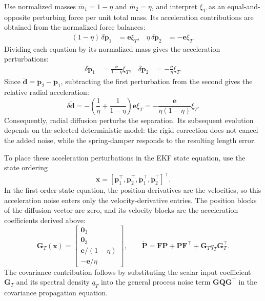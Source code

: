 \documentclass[]{article}
\newcommand{\x}{\bm{x}}
\newcommand{\Pm}{\mathbf{P}}
\newcommand{\Fm}{\mathbf{F}}
\newcommand{\Gm}{\mathbf{G}}
\newcommand{\Qm}{\mathbf{Q}}
\begin{document}
Use normalized masses $\bar m_1=1-\eta$ and $\bar m_2=\eta$, and interpret
$\xi_T$ as an equal-and-opposite perturbing force per unit total mass. Its
acceleration contributions are obtained from the normalized force balances:
\begin{align*}
  (1-\eta)\,\delta\ddot{\mathbf{p}}_1 &= \mathbf{e}\xi_T, &
  \eta\,\delta\ddot{\mathbf{p}}_2 &= -\mathbf{e}\xi_T.
\end{align*}
Dividing each equation by its normalized mass gives the acceleration
perturbations:
\begin{align*}
  \delta\ddot{\mathbf{p}}_1 &= \frac{\mathbf{e}}{1-\eta}\xi_T, &
  \delta\ddot{\mathbf{p}}_2 &= -\frac{\mathbf{e}}{\eta}\xi_T.
\end{align*}
Since $\ddot{\mathbf{d}}=\ddot{\mathbf{p}}_2-\ddot{\mathbf{p}}_1$,
subtracting the first perturbation from the second gives the relative radial
acceleration:
\begin{equation}
  \delta\ddot{\mathbf{d}}
  =-\left(\frac{1}{\eta}+\frac{1}{1-\eta}\right)\mathbf{e}\xi_T
  =-\frac{\mathbf{e}}{\eta(1-\eta)}\xi_T.
\end{equation}
Consequently, radial diffusion perturbs the separation. Its subsequent
evolution depends on the selected deterministic model: the rigid correction
does not cancel the added noise, while the spring-damper responds to the
resulting length error.

To place these acceleration perturbations in the EKF state equation, use the
state ordering
\begin{equation}
  \x=[\mathbf{p}_1^\top,\mathbf{p}_2^\top,
      \dot{\mathbf{p}}_1^\top,\dot{\mathbf{p}}_2^\top]^\top.
\end{equation}
In the first-order state equation, the position derivatives are the
velocities, so this acceleration noise enters only the velocity-derivative
entries. The position blocks of the diffusion vector are zero, and its
velocity blocks are the acceleration coefficients derived above:
\begin{equation}
  \Gm_T(\x) =
  \begin{bmatrix}
    \mathbf{0}_3\\
    \mathbf{0}_3\\
    \mathbf{e}/(1-\eta)\\
    -\mathbf{e}/\eta
  \end{bmatrix},
  \qquad
  \dot{\Pm} = \Fm\Pm+\Pm\Fm^\top+\Gm_T q_T \Gm_T^\top.
\end{equation}
The covariance contribution follows by substituting the scalar input
coefficient $\Gm_T$ and its spectral density $q_T$ into the general process
noise term $\Gm\Qm\Gm^\top$ in the covariance propagation equation.
\end{document}
